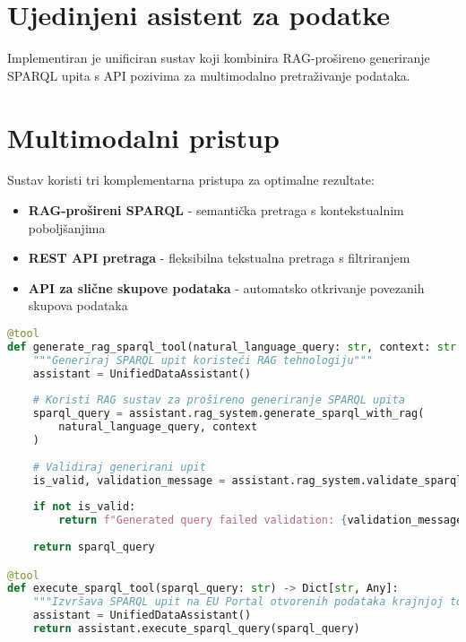 \section{Ujedinjeni asistent za podatke}
\label{sec:unified_assistant}

Implementiran je unificiran sustav koji kombinira RAG-prošireno generiranje SPARQL upita s API pozivima za multimodalno pretraživanje podataka.

\section{Multimodalni pristup}
\label{sec:multimodal_approach}

Sustav koristi tri komplementarna pristupa za optimalne rezultate:

\begin{itemize}
    \item \textbf{RAG-prošireni SPARQL} - semantička pretraga s kontekstualnim poboljšanjima
    \item \textbf{REST API pretraga} - fleksibilna tekstualna pretraga s filtriranjem
    \item \textbf{API za slične skupove podataka} - automatsko otkrivanje povezanih skupova podataka
\end{itemize}

\begin{lstlisting}[language=Python, caption=Ujedinjeni asistent za podatke - sustav agenata]
@tool
def generate_rag_sparql_tool(natural_language_query: str, context: str = "") -> str:
    """Generiraj SPARQL upit koristeći RAG tehnologiju"""
    assistant = UnifiedDataAssistant()
    
    # Koristi RAG sustav za prošireno generiranje SPARQL upita
    sparql_query = assistant.rag_system.generate_sparql_with_rag(
        natural_language_query, context
    )
    
    # Validiraj generirani upit
    is_valid, validation_message = assistant.rag_system.validate_sparql_query(sparql_query)
    
    if not is_valid:
        return f"Generated query failed validation: {validation_message}"
    
    return sparql_query

@tool
def execute_sparql_tool(sparql_query: str) -> Dict[str, Any]:
    """Izvršava SPARQL upit na EU Portal otvorenih podataka krajnjoj točki"""
    assistant = UnifiedDataAssistant()
    return assistant.execute_sparql_query(sparql_query)
\end{lstlisting}

